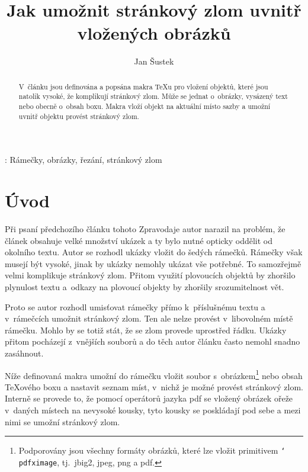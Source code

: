 \documentclass{csbulletin}
\def\p#1{\texttt{\char`\\#1}}
\def\soub#1{{\sf#1}}
\begin{document}
\shorthandoff{-}

\title{Jak umožnit stránkový zlom uvnitř vložených obrázků}
\author{Jan Šustek}

\maketitle[3pt]

\def\JSvvvskip{\vskip-24ptplus6ptminus6pt\vbox{}\vskip0pt}


\begin{abstract}
V~článku jsou definována a popsána makra \TeX u pro vložení objektů, které jsou natolik vysoké, že komplikují stránkový zlom. Může se jednat o~obrázky, vysázený text nebo obecně o~obsah boxu. Makra vloží objekt na aktuální místo sazby a umožní uvnitř objektu provést stránkový zlom.
\end{abstract}
\klicovaslova: Rámečky, obrázky, řezání, stránkový zlom


\section{Úvod}

Při psaní předchozího článku tohoto Zpravodaje autor narazil na problém, že článek obsahuje velké množství ukázek a ty bylo nutné opticky oddělit od okolního textu. Autor se rozhodl ukázky vložit do šedých rámečků. Rámečky však musejí být vysoké, jinak by ukázky nemohly ukázat vše potřebné. To samozřejmě velmi komplikuje stránkový zlom. Přitom využití plovoucích objektů by zhoršilo plynulost textu a~odkazy na plovoucí objekty by zhoršily srozumitelnost vět.

Proto se autor rozhodl umisťovat rámečky přímo k~příslušnému textu a v~rámečcích umožnit stránkový zlom. Ten ale nelze provést v~libovolném místě rámečku. Mohlo by se totiž stát, že se zlom provede uprostřed řádku. Ukázky přitom pocházejí z~vnějších souborů a do těch autor článku často nemohl snadno zasáhnout.

Níže definovaná makra umožní do rámečku vložit soubor s~obrázkem\footnote{Podporovány jsou všechny formáty obrázků, které lze vložit primitivem \p{pdfximage}, tj.~\soub{jbig2}, \soub{jpeg}, \soub{png} a \soub{pdf}.} nebo obsah \TeX ového boxu a nastavit seznam míst, v~nichž je možné provést stránkový zlom. Interně se provede to, že pomocí operátorů jazyka pdf se vložený obrázek ořeže v~daných místech na nevysoké kousky, tyto kousky se poskládají pod sebe a mezi nimi se umožní stránkový zlom.
\end{document}

